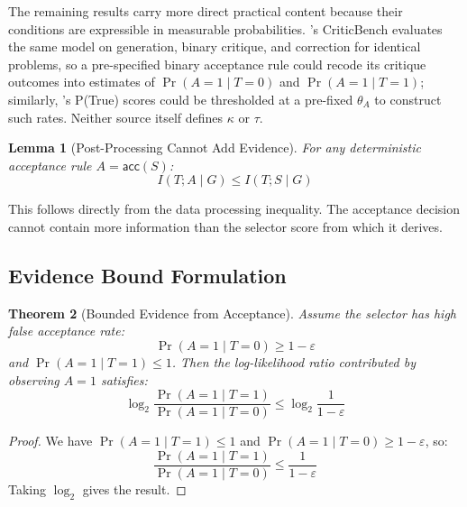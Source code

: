 \documentclass[a4paper,journal]{IAENGtran}
\newtheorem{Theorem}{Theorem}[section]
\newtheorem{Lemma}[Theorem]{Lemma}
\begin{document}
The remaining results carry more direct practical content because their conditions are
expressible in measurable probabilities. \cite{lin2024criticbench}'s CriticBench
evaluates the same model on generation, binary critique, and correction for identical
problems, so a pre-specified binary acceptance rule could recode its critique outcomes
into estimates of $\Pr(A{=}1\mid T{=}0)$ and $\Pr(A{=}1\mid T{=}1)$; similarly,
\cite{kadavath2022ptrue}'s P(True) scores could be thresholded at a pre-fixed
$\theta_A$ to construct such rates. Neither source itself defines $\kappa$ or $\tau$.

\begin{Lemma}[Post-Processing Cannot Add Evidence]
\label{lem:post_processing}
For any deterministic acceptance rule $A = \mathsf{acc}(S)$:
\begin{equation}
I(T; A \mid G) \leq I(T; S \mid G)
\end{equation}
\end{Lemma}

This follows directly from the data processing inequality. The acceptance decision cannot
contain more information than the selector score from which it derives.

\subsection{Evidence Bound Formulation}

\begin{Theorem}[Bounded Evidence from Acceptance]
\label{thm:evidence_bound}
Assume the selector has high false acceptance rate:
\begin{equation}
\Pr(A = 1 \mid T = 0) \geq 1 - \varepsilon
\end{equation}
and $\Pr(A = 1 \mid T = 1) \leq 1$. Then the log-likelihood ratio contributed by observing
$A = 1$ satisfies:
\begin{equation}
\log_2 \frac{\Pr(A = 1 \mid T = 1)}{\Pr(A = 1 \mid T = 0)} \leq \log_2 \frac{1}{1 - \varepsilon}
\end{equation}
\end{Theorem}

\begin{proof}
We have $\Pr(A = 1 \mid T = 1) \leq 1$ and $\Pr(A = 1 \mid T = 0) \geq 1 - \varepsilon$,
so:
\begin{equation}
\frac{\Pr(A = 1 \mid T = 1)}{\Pr(A = 1 \mid T = 0)} \leq \frac{1}{1 - \varepsilon}
\end{equation}
Taking $\log_2$ gives the result. 
\end{proof}
\end{document}
